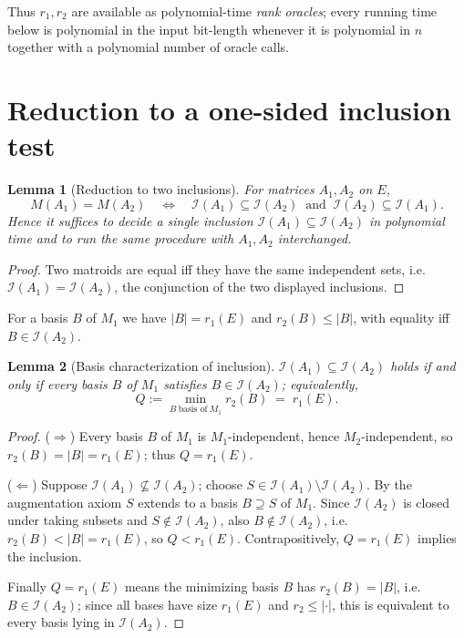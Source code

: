 \documentclass{amsart}
\theoremstyle{plain}
\newtheorem{lemma}{Lemma}
\theoremstyle{definition}
\newcommand{\I}{\mathcal{I}}
\begin{document}
Thus $r_1,r_2$ are available as polynomial-time \emph{rank oracles}; every running time below is
polynomial in the input bit-length whenever it is polynomial in $n$ together with a polynomial
number of oracle calls.

\section{Reduction to a one-sided inclusion test}\label{sec:reduction}

\begin{lemma}[Reduction to two inclusions]\label{lem:reduction}
For matrices $A_1,A_2$ on $E$,
\[
   M(A_1)=M(A_2)\quad\Longleftrightarrow\quad \I(A_1)\subseteq\I(A_2)\ \text{ and }\ \I(A_2)\subseteq\I(A_1).
\]
Hence it suffices to decide a single inclusion $\I(A_1)\subseteq\I(A_2)$ in polynomial time and
to run the same procedure with $A_1,A_2$ interchanged.
\end{lemma}

\begin{proof}
Two matroids are equal iff they have the same independent sets, i.e. $\I(A_1)=\I(A_2)$, the
conjunction of the two displayed inclusions. \qedhere
\end{proof}

For a basis $B$ of $M_1$ we have $|B|=r_1(E)$ and $r_2(B)\le|B|$, with equality iff
$B\in\I(A_2)$.

\begin{lemma}[Basis characterization of inclusion]\label{lem:basis}
$\I(A_1)\subseteq\I(A_2)$ holds if and only if every basis $B$ of $M_1$ satisfies
$B\in\I(A_2)$; equivalently,
\[
   Q:=\min_{B\ \text{basis of}\ M_1} r_2(B)\;=\;r_1(E).
\]
\end{lemma}

\begin{proof}
($\Rightarrow$) Every basis $B$ of $M_1$ is $M_1$-independent, hence $M_2$-independent, so
$r_2(B)=|B|=r_1(E)$; thus $Q=r_1(E)$.

($\Leftarrow$) Suppose $\I(A_1)\not\subseteq\I(A_2)$; choose $S\in\I(A_1)\setminus\I(A_2)$. By the
augmentation axiom $S$ extends to a basis $B\supseteq S$ of $M_1$. Since $\I(A_2)$ is closed under
taking subsets and $S\notin\I(A_2)$, also $B\notin\I(A_2)$, i.e. $r_2(B)<|B|=r_1(E)$, so
$Q<r_1(E)$. Contrapositively, $Q=r_1(E)$ implies the inclusion.

Finally $Q=r_1(E)$ means the minimizing basis $B$ has $r_2(B)=|B|$, i.e.\ $B\in\I(A_2)$; since all
bases have size $r_1(E)$ and $r_2\le|\cdot|$, this is equivalent to every basis lying in
$\I(A_2)$. \qedhere
\end{proof}
\end{document}
